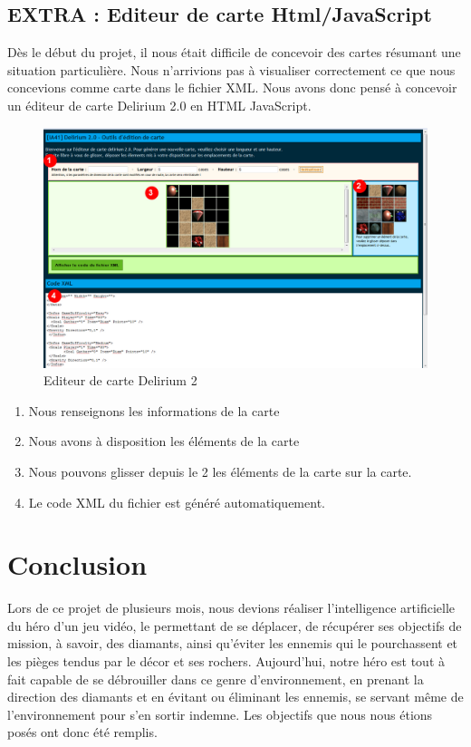 \documentclass[a4paper,11pt]{article}
\begin{document}
	\newpage
	\subsection{EXTRA : Editeur de carte Html/JavaScript}
	
D\`es le d\'ebut du projet, il nous \'etait difficile de concevoir des cartes r\'esumant une situation particuli\`ere. Nous n'arrivions pas \`a visualiser correctement ce que nous concevions comme carte dans le fichier XML. Nous avons donc pens\'e \`a concevoir un \'editeur de carte Delirium 2.0 en HTML \/ JavaScript.

	\begin{figure}[h]
			\center
			\includegraphics[width=12cm]{editeur}
			\caption{\label{situation22} Editeur de carte Delirium 2 }
		\end{figure}
		
	\begin{enumerate}
		\item Nous renseignons les informations de la carte
		\item Nous avons \`a disposition les \'el\'ements de la carte
		\item Nous pouvons glisser depuis le \og{} 2 \fg{} les \'el\'ements de la carte sur la carte.
		\item Le code XML du fichier est g\'en\'er\'e automatiquement.
	\end{enumerate}
	
	\newpage
	\section{Conclusion}
	
Lors de ce projet de plusieurs mois, nous devions r\'ealiser l'intelligence artificielle du h\'ero d'un jeu vid\'eo, le permettant de se d\'eplacer, de r\'ecup\'erer ses objectifs de mission, \`a savoir, des diamants, ainsi qu'\'eviter les ennemis qui le pourchassent et les pi\`eges tendus par le d\'ecor et ses rochers. Aujourd'hui, notre h\'ero est tout \`a fait capable de se d\'ebrouiller dans ce genre d'environnement, en prenant la direction des diamants et en \'evitant ou \'eliminant les ennemis, se servant m\^eme de l'environnement pour s'en sortir indemne. Les objectifs que nous nous \'etions pos\'es ont donc \'et\'e remplis.\\
\end{document}
